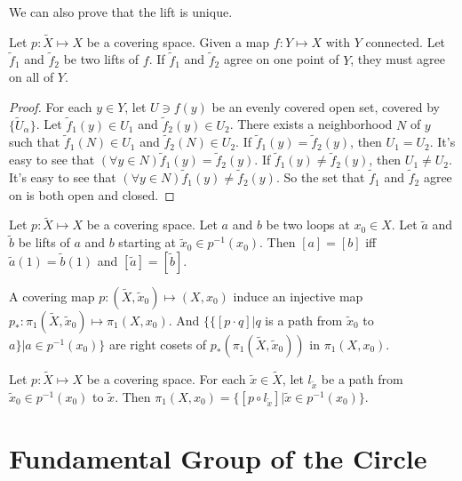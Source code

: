 \documentclass[12pt]{book}
\begin{document}
We can also prove that the lift is unique. 
\begin{lemma}
	Let $p:\tilde X\mapsto X$ be a covering space. Given a map $f:Y\mapsto X$ with $Y$ connected. Let $\tilde f_1$ and $\tilde f_2$ be two lifts of $f$. If $\tilde f_1$ and $\tilde f_2$ agree on one point of $Y$, they must agree on all of $Y$.
\end{lemma}
\begin{proof}
	For each $y\in Y$, let $U\ni f(y)$ be an evenly covered open set, covered by $\{\tilde U_\alpha\}$. Let $\tilde f_1(y)\in U_1$ and $\tilde f_2(y)\in U_2$. There exists a neighborhood $N$ of $y$ such that $\tilde f_1(N)\in U_1$ and $\tilde f_2(N)\in U_2$. If $\tilde f_1(y)=\tilde f_2(y)$, then $U_1=U_2$. It's easy to see that $(\forall y\in N)\tilde f_1(y)=\tilde f_2(y)$. If $\tilde f_1(y)\neq\tilde f_2(y)$, then $U_1\neq U_2$. It's easy to see that $(\forall y\in N)\tilde f_1(y)\neq\tilde f_2(y)$. So the set that $\tilde f_1$ and $\tilde f_2$ agree on is both open and closed.
\end{proof}

\begin{lemma}
	Let $p:\tilde X\mapsto X$ be a covering space. Let $a$ and $b$ be two loops at $x_0\in X$. Let $\tilde a$ and $\tilde b$ be lifts of $a$ and $b$ starting at $\tilde x_0\in p^{-1}(x_0)$. Then $[a]=[b]$ iff $\tilde a(1)=\tilde b(1)$ and $[\tilde a]=[\tilde b]$. 
\end{lemma}

\begin{corollary}
	A covering map $p:(\tilde X,\tilde x_0)\mapsto( X, x_0)$ induce an injective map $p_*:\pi_1(\tilde X,\tilde x_0)\mapsto\pi_1( X, x_0)$. And $\{\{[p\cdot q]|q $ is a path from $\tilde x_0$ to $a\}|a\in p^{-1}(x_0)\}$ are right cosets of $p_*(\pi_1(\tilde X,\tilde x_0))$ in $\pi_1( X, x_0)$.
\end{corollary}

\begin{corollary}
	Let $p:\tilde X\mapsto X$ be a covering space. For each $\tilde x\in \tilde X$, let $l_{\tilde x}$ be a path from $\tilde x_0\in p^{-1}(x_0)$ to $\tilde x$. Then $\pi_1( X, x_0)=\{[p\circ l_{\tilde x}]|\tilde x\in p^{-1}(x_0)\}$.
\end{corollary}

\section{Fundamental Group of the Circle}
\end{document}

